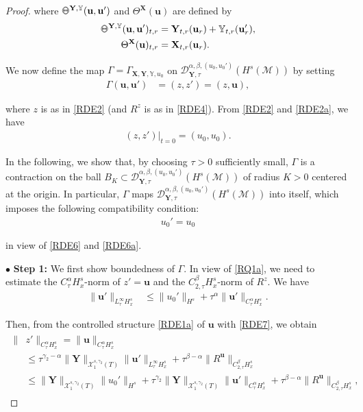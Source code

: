 \documentclass[letterpaper, 11pt,  reqno]{amsart}
\newcommand{\1}{\hspace{0.5mm}\textup{I}\hspace{0.5mm}}
\newcommand{\noi}{\noindent}
\newcommand{\bul}{\bullet}
\newcommand{\D}{\mathcal{D}}
\newcommand{\al}{\alpha}
\newcommand{\be}{\beta}
\newcommand{\g}{\gamma}
\newcommand{\G}{\Gamma}
\newcommand{\M}{\mathcal{M}}
\newcommand{\cX}{\mathcal{X}}
\newcommand{\uu}{\mathbf{u}}
\newcommand{\Ta}{\Theta}
\newcommand{\YYb}{\mathbb{Y}}
\newcommand{\XX}{\mathbf{X}}
\newcommand{\YY}{\mathbf{Y}}
\def\doublestroke#1{\pdfliteral{1 Tr .35 w}#1\pdfliteral{0 Tr 0 w}}
\newcommand{\Taa}{\doublestroke{\Theta}}
\numberwithin{equation}{section}
\numberwithin{theorem}{section}
\begin{document}
\begin{proof}
\noi
where
$\Taa^{\YY, \YYb}(\uu, \uu')$ and 
$\Ta^\XX(\uu)$ are defined by 
\begin{align}
\begin{split}
\Taa^{\YY, \YYb}(\uu, \uu')_{t, r}
& = \YY_{t,r}(\uu_r) + \YYb_{t,r} (\uu'_r), \\
\Ta^\XX(\uu)_{t, r} & = \XX_{t,r}(\uu_r). 
\end{split}
\label{RDE5}
\end{align}


\noi
We now 
define the map $\G = \G_{\XX, \YY, \YYb, u_0}$
on $ \D^{\al,\be, (u_0, u_0')}_{\YY, \tau}(H^s(\M))$
by setting
\begin{align}
\G(\uu, \uu')
& = (z, z')
= (z, \uu), 
\label{RDE6}
\end{align}

\noi
where $z$ is as in \eqref{RDE2}
(and $R^z$ is as in \eqref{RDE4}).
From \eqref{RDE2} and \eqref{RDE2a}, we have 
\begin{align}
(z, z')|_{t = 0} = (u_0, u_0).
\label{RDE6a}
\end{align}


\noi
In the following, we show that, 
 by choosing $\tau > 0$ sufficiently small, 
$\G$ is a contraction on 
the ball $B_K
\subset \D^{\al,\be, (u_0, u_0')}_{\YY, \tau}(H^s(\M))$
 of radius $K > 0$ centered at the origin.
In particular, 
$\G$ maps 
$ \D^{\al,\be, (u_0, u_0')}_{\YY, \tau}(H^s(\M))$
into itself, which imposes
the following 
 compatibility condition:
\begin{align}
u_0' = u_0
\label{REG2}
\end{align}

\noi
in view of \eqref{RDE6} and \eqref{RDE6a}.


\medskip

\noi
$\bul$ {\bf Step 1:}
We first show boundedness
of $\G$. 
In view of \eqref{RQ1a}, 
we need to estimate the $C^\al_\tau H^s_x$-norm of $z' = \uu$
and the $C^\be_{2, \tau} H^s_x$-norm of $R^z$.
We have 
\begin{align}
\| \uu'\|_{L^\infty_\tau H^s_x} 
& \le \|u_0'\|_{H^s} 
+ \tau^\al \|\uu '\|_{C^\al_\tau H^s_x}.
\label{RDE7}
\end{align}


\noi
Then, from  the controlled structure \eqref{RDE1a} of $\uu$ with \eqref{RDE7}, 
we obtain
\begin{align}
\begin{split}
\| & z'\|_{C^\al_\tau H^s_x}
 = \| \uu\|_{C^\al_\tau H^s_x}\\
&  \le \tau^{\g_2 - \al}\| \YY\|_{\cX^{s, \g_2}_1(T)} \|\uu'\|_{L^\infty_\tau H^s_x}
+ \tau^{\be - \al}\| R^\uu\|_{C^\be_{2, \tau } H^s_x}\\
& \le  \| \YY\|_{\cX^{s, \g_2}_1(T)}\|u_0'\|_{H^s} 
+ \tau^{\g_2} \| \YY\|_{\cX^{s, \g_2}_1(T)}\|\uu '\|_{C^\al_\tau H^s_x}
+ \tau^{\be - \al}\| R^\uu\|_{C^\be_{2, \tau } H^s_x}, 
\end{split}
\label{RDE8}
\end{align}


\end{proof}
\end{document}
